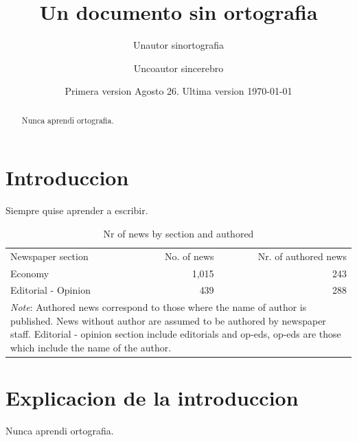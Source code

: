 \documentclass{article}
\begin{document}
    \title{Un documento sin ortografia}
    \author{Unautor sinortografia \and Uncoautor sincerebro}
    \date{Primera version Agosto 26. Ultima version \today}
    \maketitle

    \begin{abstract}
        Nunca aprendi ortografia.
    \end{abstract}

\newpage
\tableofcontents
\listoftables
\listoffigures

\newpage
\section{Introduccion}\label{sec.intro}
    Siempre quise aprender a escribir.

    \begin{table}[h]
        \centering
        \caption[Nr of news by section and authored]{Nr of news by section and authored}
        \begin{tabular}{lrr}
        \hline
        Newspaper section & No. of news & Nr. of authored news \\
        Economy & 1,015 & 243 \\
        Editorial - Opinion & 439 & 288 \\
        \hline
        \multicolumn{3}{p{0.70\textwidth}}{\footnotesize{\emph{Note}: Authored news correspond to those where the name of author is published. News without author are assumed to be authored by newspaper staff. Editorial - opinion section include editorials and op-eds, op-eds are those which include the name of the author.}}\\
        \end{tabular}
        \label{tab:news.description}
    \end{table}

\section{Explicacion de la introduccion}\label{sec.intro.explicacion}
    Nunca aprendi ortografia.
\end{document}
